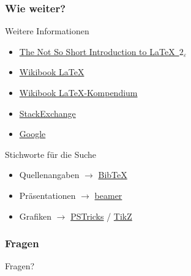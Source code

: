 \begin{frame}[fragile]
    \frametitle{Wie weiter?}
    \begin{block}{Weitere Informationen}
        \begin{itemize}
            \item \href{https://tobi.oetiker.ch/lshort/lshort.pdf}
                    {The Not So Short Introduction to \LaTeX \, $2_\varepsilon$}
            \item \href{https://en.wikibooks.org/wiki/LaTeX}{Wikibook \LaTeX}
            \item \href{https://de.wikibooks.org/wiki/LaTeX-Kompendium}
                    {Wikibook \LaTeX-Kompendium}
            \item \href{http://tex.stackexchange.com/}{StackExchange}
            \item \href{https://www.google.ch/}{Google}
        \end{itemize}
    \end{block}
    \pause
    \begin{block}{Stichworte für die Suche}
        \begin{itemize}
            \item Quellenangaben
                $\to$ \href{https://www.google.ch/#q=LaTeX+BibTex}{BibTeX}
            \item Präsentationen
                $\to$ \href{https://www.google.ch/#q=LaTeX+beamer}{beamer}
            \item Grafiken
                $\to$ \href{https://www.google.ch/#q=LaTeX+PSTricks}{PSTricks} 
                / \href{https://www.google.ch/#q=LaTeX+TikZ}{TikZ}
        \end{itemize}
    \end{block}
\end{frame}
\begin{frame}
    \frametitle{Fragen}
    \begin{center}
        \Huge{Fragen?}
    \end{center}
\end{frame}
